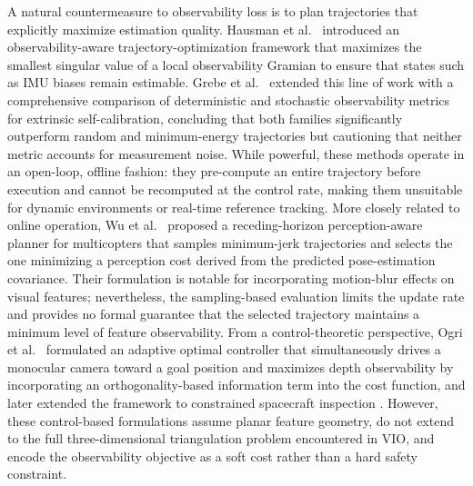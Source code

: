 \documentclass[journal]{IEEEtran}
\begin{document}
A natural countermeasure to observability loss is to plan trajectories that explicitly maximize estimation quality. Hausman et al.\ \cite{hausman2016obsaware} introduced an observability-aware trajectory-optimization framework that maximizes the smallest singular value of a local observability Gramian to ensure that states such as IMU biases remain estimable. Grebe et al.\ \cite{grebe2021obsaware} extended this line of work with a comprehensive comparison of deterministic and stochastic observability metrics for extrinsic self-calibration, concluding that both families significantly outperform random and minimum-energy trajectories but cautioning that neither metric accounts for measurement noise. While powerful, these methods operate in an open-loop, offline fashion: they pre-compute an entire trajectory 
before execution and cannot be recomputed at the control rate, making them unsuitable for dynamic environments or real-time reference tracking. More closely related to online operation, Wu et al.\ \cite{wu2022perception} proposed a receding-horizon perception-aware planner for multicopters that samples minimum-jerk trajectories and selects the one minimizing a perception cost derived from the predicted pose-estimation covariance. Their formulation is notable for incorporating
motion-blur effects on visual features; nevertheless, the sampling-based evaluation limits the update rate and provides no formal guarantee that the selected trajectory maintains a minimum level of feature observability. From a control-theoretic perspective, Ogri et al.\ \cite{ogri2024adaptive} formulated an adaptive optimal controller that simultaneously drives a monocular camera toward a goal position and maximizes depth observability by incorporating an orthogonality-based information term into the cost function, and later extended the framework to constrained spacecraft inspection \cite{ogri2025monocular}. However, these control-based formulations assume planar feature geometry, do not extend to the full three-dimensional triangulation problem encountered in VIO, and encode the observability objective as a soft cost rather than a hard safety constraint.
\end{document}
